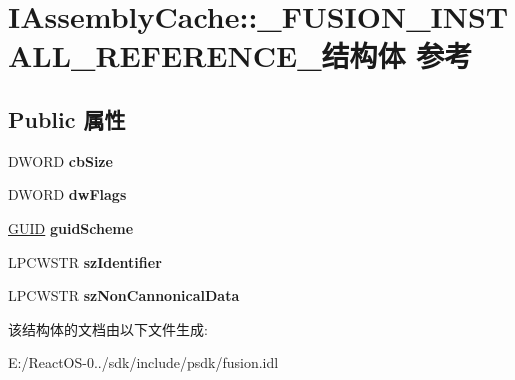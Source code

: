 \hypertarget{struct_i_assembly_cache_1_1___f_u_s_i_o_n___i_n_s_t_a_l_l___r_e_f_e_r_e_n_c_e__}{}\section{I\+Assembly\+Cache\+:\+:\+\_\+\+F\+U\+S\+I\+O\+N\+\_\+\+I\+N\+S\+T\+A\+L\+L\+\_\+\+R\+E\+F\+E\+R\+E\+N\+C\+E\+\_\+结构体 参考}
\label{struct_i_assembly_cache_1_1___f_u_s_i_o_n___i_n_s_t_a_l_l___r_e_f_e_r_e_n_c_e__}
\subsection*{Public 属性}
\begin{DoxyCompactItemize}
\item 
\mbox{\label{struct_i_assembly_cache_1_1___f_u_s_i_o_n___i_n_s_t_a_l_l___r_e_f_e_r_e_n_c_e___aa0a225c2b112f805a30cb4a6bdd7c27c}} 
D\+W\+O\+RD {\bfseries cb\+Size}
\item 
\mbox{\label{struct_i_assembly_cache_1_1___f_u_s_i_o_n___i_n_s_t_a_l_l___r_e_f_e_r_e_n_c_e___a43ccfc217f3650a7f4d27a5df9f1617f}} 
D\+W\+O\+RD {\bfseries dw\+Flags}
\item 
\mbox{\label{struct_i_assembly_cache_1_1___f_u_s_i_o_n___i_n_s_t_a_l_l___r_e_f_e_r_e_n_c_e___a01bbbf7a58cfcf491f0e5f26922de04c}} 
\hyperlink{interface_g_u_i_d}{G\+U\+ID} {\bfseries guid\+Scheme}
\item 
\mbox{\label{struct_i_assembly_cache_1_1___f_u_s_i_o_n___i_n_s_t_a_l_l___r_e_f_e_r_e_n_c_e___a96ab183589c098102784e4081ba48123}} 
L\+P\+C\+W\+S\+TR {\bfseries sz\+Identifier}
\item 
\mbox{\label{struct_i_assembly_cache_1_1___f_u_s_i_o_n___i_n_s_t_a_l_l___r_e_f_e_r_e_n_c_e___ae04ca0edb140cc089a09355f44a06b82}} 
L\+P\+C\+W\+S\+TR {\bfseries sz\+Non\+Cannonical\+Data}
\end{DoxyCompactItemize}


该结构体的文档由以下文件生成\+:\begin{DoxyCompactItemize}
\item 
E\+:/\+React\+O\+S-\/0../sdk/include/psdk/fusion.\+idl\end{DoxyCompactItemize}
